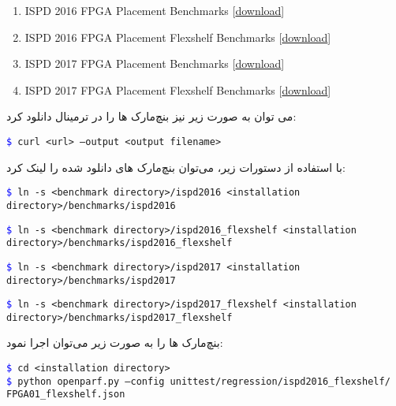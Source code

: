 \begin{latin}
	\begin{enumerate}
		\item ISPD 2016 FPGA Placement Benchmarks [\href{https://drive.google.com/file/d/1kzg0NfEmJvwzhJADPE_Q0UjS6UpVCMZZ/view}{download}]
		\item ISPD 2016 FPGA Placement Flexshelf Benchmarks [\href{https://drive.google.com/file/d/1lwYSwfIPfzOxi_SfOZj5DyiwROLJDFd0/view}{download}]
		\item ISPD 2017 FPGA Placement Benchmarks [\href{https://drive.google.com/file/d/1Uf9qIZ8WL_jk03sIlAoS9dIrvYH3d1pz/view}{download}]
		\item ISPD 2017 FPGA Placement Flexshelf Benchmarks [\href{https://drive.google.com/file/d/1smt4lGUFdhs0TjPBzi9PqiyfA9n2Uwoy/view}{download}]
	\end{enumerate}
\end{latin}

می توان به صورت زیر نیز بنچ‌مارک ها را در ترمینال دانلود کرد:
\begin{latin}
	\texttt{\textcolor{blue}{\$} curl <url> --output <output filename>}
\end{latin}

با استفاده از دستورات زیر، می‌توان بنچ‌مارک های دانلود شده را لینک کرد:
\begin{latin}
	\texttt{\textcolor{blue}{\$} ln -s <benchmark directory>/ispd2016 <installation}\\
	\texttt{directory>/benchmarks/ispd2016}
	
	\texttt{\textcolor{blue}{\$} ln -s <benchmark directory>/ispd2016\_flexshelf <installation}\\
	\texttt{directory>/benchmarks/ispd2016\_flexshelf}
	
	\texttt{\textcolor{blue}{\$} ln -s <benchmark directory>/ispd2017 <installation}\\
	\texttt{directory>/benchmarks/ispd2017}
	
	\texttt{\textcolor{blue}{\$} ln -s <benchmark directory>/ispd2017\_flexshelf <installation}\\
	\texttt{directory>/benchmarks/ispd2017\_flexshelf}
\end{latin}


بنچ‌مارک ها را به صورت زیر می‌توان اجرا نمود:

\begin{latin}
	\texttt{\textcolor{blue}{\$} cd <installation directory>}\\
	\texttt{\textcolor{blue}{\$} python openparf.py --config unittest/regression/ispd2016\_flexshelf/}\\
	\texttt{FPGA01\_flexshelf.json}
\end{latin}